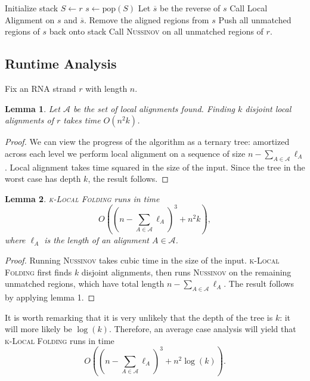 \documentclass[11pt]{article}
\newcommand{\klf}{\textsc{k-Local Folding}\xspace}
\newcommand{\rf}{\textsc{Nussinov}\xspace}
\newtheorem{lemma}{Lemma}
\newcommand{\al}{\mathscr{A}}
\begin{document}
\begin{algorithm}[h]
\caption{\klf}
\label{alg:klf}
\begin{algorithmic}[1]
\State Initialize stack $S\gets r$
\State $s\gets \text{pop}(S)$
\State Let $\overline{s}$ be the reverse of $s$
\State Call Local Alignment on $s$ and $\overline{s}$.
\State Remove the aligned regions from $s$
\State Push all unmatched regions of $s$ back onto stack
\EndIf 
\EndWhile
\State Call \rf on all unmatched regions of $r$. 
\EndProcedure
\end{algorithmic}
\end{algorithm}


\subsection{Runtime Analysis}
Fix an RNA strand $r$ with length $n$. 
\begin{lemma}
Let $\al$ be the set of local alignments found. Finding $k$ disjoint local alignments of $r$ takes time $O(n^2 k)$. 
\end{lemma}
\begin{proof}
We can view the progress of the algorithm as a ternary tree: amortized across each level we perform local alignment on a sequence of size $n-\sum_{A\in\al}\ell_A$. Local alignment takes time squared in the size of the input. Since the tree in the worst case has depth $k$, the result follows. 
\end{proof}

\begin{lemma}
\klf runs in time
\[O\left(\left(n-\sum_{A\in\al}\ell_A\right)^3+n^2k\right),\] where $\ell_A$ is the length of an alignment $A\in\al$. 
\end{lemma}
\begin{proof}
Running \rf takes cubic time in the size of the input. \klf first finds $k$ disjoint alignments, then runs \rf on the remaining unmatched regions, which have total length $n-\sum_{A\in\al}\ell_A$.   The result follows by applying lemma 1. 
\end{proof}

It is worth remarking that it is very unlikely that the depth of the tree is $k$: it will more likely be $\log(k)$. Therefore, an average case analysis will yield that \klf runs in time 
\[O\left(\left(n-\sum_{A\in\al}\ell_A\right)^3+n^2\log (k)\right).\]
\end{document}
